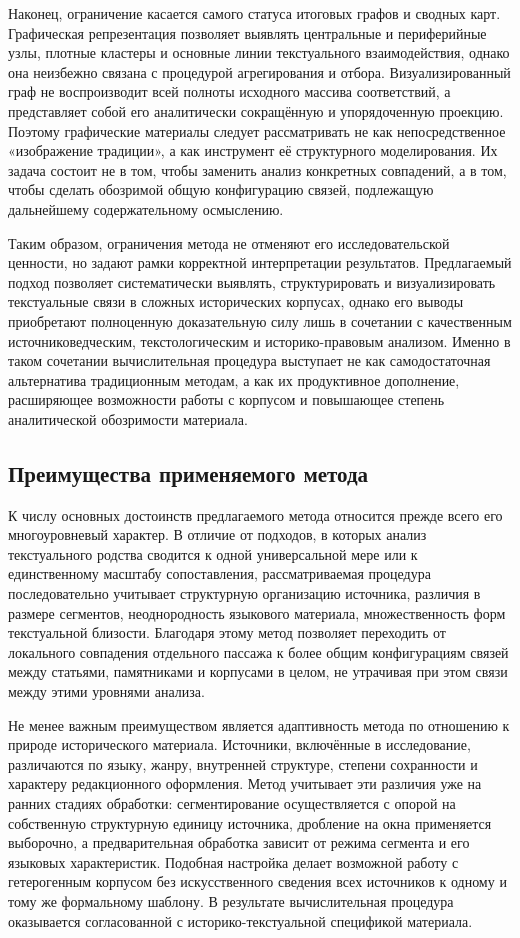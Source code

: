 Наконец, ограничение касается самого статуса итоговых графов и сводных карт. Графическая репрезентация позволяет выявлять центральные и периферийные узлы, плотные кластеры и основные линии текстуального взаимодействия, однако она неизбежно связана с процедурой агрегирования и отбора. Визуализированный граф не воспроизводит всей полноты исходного массива соответствий, а представляет собой его аналитически сокращённую и упорядоченную проекцию. Поэтому графические материалы следует рассматривать не как непосредственное «изображение традиции», а как инструмент её структурного моделирования. Их задача состоит не в том, чтобы заменить анализ конкретных совпадений, а в том, чтобы сделать обозримой общую конфигурацию связей, подлежащую дальнейшему содержательному осмыслению.

Таким образом, ограничения метода не отменяют его исследовательской ценности, но задают рамки корректной интерпретации результатов. Предлагаемый подход позволяет систематически выявлять, структурировать и визуализировать текстуальные связи в сложных исторических корпусах, однако его выводы приобретают полноценную доказательную силу лишь в сочетании с качественным источниковедческим, текстологическим и историко-правовым анализом. Именно в таком сочетании вычислительная процедура выступает не как самодостаточная альтернатива традиционным методам, а как их продуктивное дополнение, расширяющее возможности работы с корпусом и повышающее степень аналитической обозримости материала.

\subsection{Преимущества применяемого метода}

К числу основных достоинств предлагаемого метода относится прежде всего его многоуровневый характер. В отличие от подходов, в которых анализ текстуального родства сводится к одной универсальной мере или к единственному масштабу сопоставления, рассматриваемая процедура последовательно учитывает структурную организацию источника, различия в размере сегментов, неоднородность языкового материала, множественность форм текстуальной близости. Благодаря этому метод позволяет переходить от локального совпадения отдельного пассажа к более общим конфигурациям связей между статьями, памятниками и корпусами в целом, не утрачивая при этом связи между этими уровнями анализа.

Не менее важным преимуществом является адаптивность метода по отношению к природе исторического материала. Источники, включённые в исследование, различаются по языку, жанру, внутренней структуре, степени сохранности и характеру редакционного оформления. Метод учитывает эти различия уже на ранних стадиях обработки: сегментирование осуществляется с опорой на собственную структурную единицу источника, дробление на окна применяется выборочно, а предварительная обработка зависит от режима сегмента и его языковых характеристик. Подобная настройка делает возможной работу с гетерогенным корпусом без искусственного сведения всех источников к одному и тому же формальному шаблону. В результате вычислительная процедура оказывается согласованной с историко-текстуальной спецификой материала.

